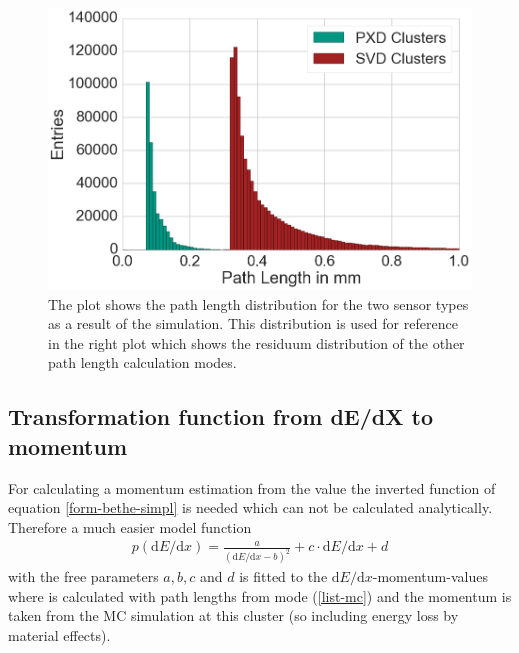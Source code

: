 \begin{figure}
 \centering
 \includegraphics[width=0.7\linewidth]{figures/vxd/pathLengths.png}
 \caption[Path length distribution for the two sensor types.]{The plot shows the path length distribution for the two sensor types as a result of the simulation. This distribution is used for reference in the right plot which shows the residuum distribution of the other path length calculation modes.}
 \label{fig-pathlengths}
\end{figure}

\subsection{Transformation function from dE/dX to momentum} \label{subsection-transform}

For calculating a momentum estimation from the \dedx value the inverted function of equation \ref{form-bethe-simpl} is needed which can not be calculated analytically. Therefore a much easier model function
\begin{align}
 p(\mathrm{d}E/\mathrm{d} x) = \frac{a}{(\mathrm{d}E/\mathrm{d} x - b)^2} + c \cdot \mathrm{d}E/\mathrm{d} x + d \label{form-model}
\end{align}
with the free parameters $a, b, c$ and $d$ is fitted to the $\mathrm d E / \mathrm d x$-momentum-values where \dedx is calculated with path lengths from mode (\ref{list-mc}) and the momentum is taken from the MC simulation at this cluster (so including energy loss by material effects).

